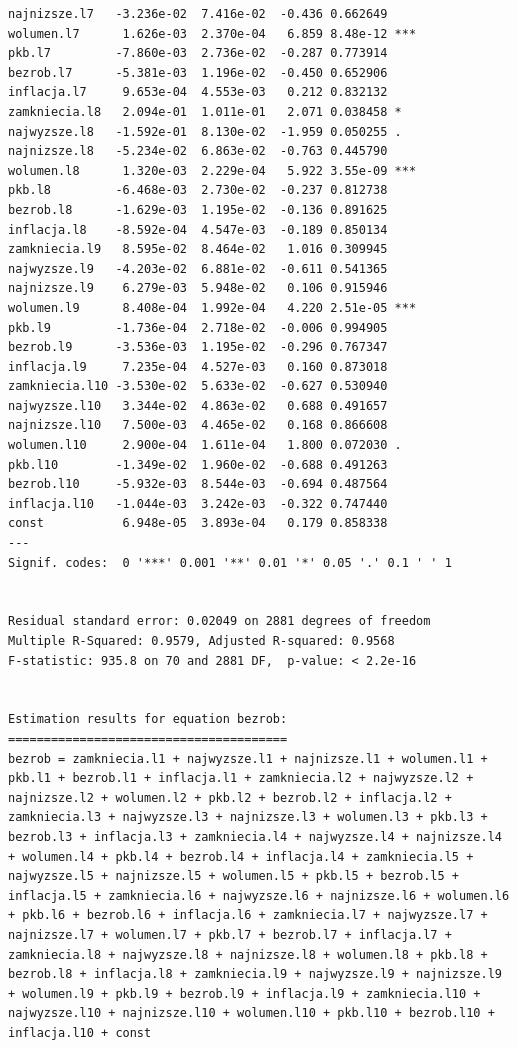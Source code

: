 \documentclass[
  polish,
  letterpaper,
  DIV=11,
  numbers=noendperiod]{scrartcl}
\begin{document}
\begin{verbatim}
najnizsze.l7   -3.236e-02  7.416e-02  -0.436 0.662649    
wolumen.l7      1.626e-03  2.370e-04   6.859 8.48e-12 ***
pkb.l7         -7.860e-03  2.736e-02  -0.287 0.773914    
bezrob.l7      -5.381e-03  1.196e-02  -0.450 0.652906    
inflacja.l7     9.653e-04  4.553e-03   0.212 0.832132    
zamkniecia.l8   2.094e-01  1.011e-01   2.071 0.038458 *  
najwyzsze.l8   -1.592e-01  8.130e-02  -1.959 0.050255 .  
najnizsze.l8   -5.234e-02  6.863e-02  -0.763 0.445790    
wolumen.l8      1.320e-03  2.229e-04   5.922 3.55e-09 ***
pkb.l8         -6.468e-03  2.730e-02  -0.237 0.812738    
bezrob.l8      -1.629e-03  1.195e-02  -0.136 0.891625    
inflacja.l8    -8.592e-04  4.547e-03  -0.189 0.850134    
zamkniecia.l9   8.595e-02  8.464e-02   1.016 0.309945    
najwyzsze.l9   -4.203e-02  6.881e-02  -0.611 0.541365    
najnizsze.l9    6.279e-03  5.948e-02   0.106 0.915946    
wolumen.l9      8.408e-04  1.992e-04   4.220 2.51e-05 ***
pkb.l9         -1.736e-04  2.718e-02  -0.006 0.994905    
bezrob.l9      -3.536e-03  1.195e-02  -0.296 0.767347    
inflacja.l9     7.235e-04  4.527e-03   0.160 0.873018    
zamkniecia.l10 -3.530e-02  5.633e-02  -0.627 0.530940    
najwyzsze.l10   3.344e-02  4.863e-02   0.688 0.491657    
najnizsze.l10   7.500e-03  4.465e-02   0.168 0.866608    
wolumen.l10     2.900e-04  1.611e-04   1.800 0.072030 .  
pkb.l10        -1.349e-02  1.960e-02  -0.688 0.491263    
bezrob.l10     -5.932e-03  8.544e-03  -0.694 0.487564    
inflacja.l10   -1.044e-03  3.242e-03  -0.322 0.747440    
const           6.948e-05  3.893e-04   0.179 0.858338    
---
Signif. codes:  0 '***' 0.001 '**' 0.01 '*' 0.05 '.' 0.1 ' ' 1


Residual standard error: 0.02049 on 2881 degrees of freedom
Multiple R-Squared: 0.9579, Adjusted R-squared: 0.9568 
F-statistic: 935.8 on 70 and 2881 DF,  p-value: < 2.2e-16 


Estimation results for equation bezrob: 
======================================= 
bezrob = zamkniecia.l1 + najwyzsze.l1 + najnizsze.l1 + wolumen.l1 + pkb.l1 + bezrob.l1 + inflacja.l1 + zamkniecia.l2 + najwyzsze.l2 + najnizsze.l2 + wolumen.l2 + pkb.l2 + bezrob.l2 + inflacja.l2 + zamkniecia.l3 + najwyzsze.l3 + najnizsze.l3 + wolumen.l3 + pkb.l3 + bezrob.l3 + inflacja.l3 + zamkniecia.l4 + najwyzsze.l4 + najnizsze.l4 + wolumen.l4 + pkb.l4 + bezrob.l4 + inflacja.l4 + zamkniecia.l5 + najwyzsze.l5 + najnizsze.l5 + wolumen.l5 + pkb.l5 + bezrob.l5 + inflacja.l5 + zamkniecia.l6 + najwyzsze.l6 + najnizsze.l6 + wolumen.l6 + pkb.l6 + bezrob.l6 + inflacja.l6 + zamkniecia.l7 + najwyzsze.l7 + najnizsze.l7 + wolumen.l7 + pkb.l7 + bezrob.l7 + inflacja.l7 + zamkniecia.l8 + najwyzsze.l8 + najnizsze.l8 + wolumen.l8 + pkb.l8 + bezrob.l8 + inflacja.l8 + zamkniecia.l9 + najwyzsze.l9 + najnizsze.l9 + wolumen.l9 + pkb.l9 + bezrob.l9 + inflacja.l9 + zamkniecia.l10 + najwyzsze.l10 + najnizsze.l10 + wolumen.l10 + pkb.l10 + bezrob.l10 + inflacja.l10 + const 


\end{verbatim}
\end{document}
